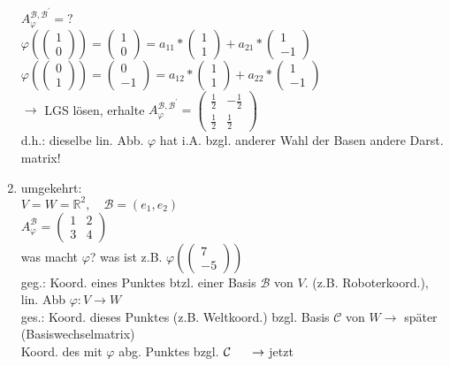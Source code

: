 \documentclass[a4paper,11pt]{article}
\newcommand{\hsp}{\hspace{5mm}}
\begin{document}
\begin{enumerate}[label=\alph*)]
	$A^{\mathcal{B},\mathcal{B}^\prime}_\varphi=?$ \\
	$\varphi\left(\begin{pmatrix}1\\0\end{pmatrix}\right)=\begin{pmatrix}1\\0\end{pmatrix}=a_{11}*\begin{pmatrix}1\\1\end{pmatrix}+a_{21}*\begin{pmatrix}1\\-1\end{pmatrix}$ \\
	$\varphi\left(\begin{pmatrix}0\\1\end{pmatrix}\right)=\begin{pmatrix}0\\-1\end{pmatrix}=a_{12}*\begin{pmatrix}1\\1\end{pmatrix}+a_{22}*\begin{pmatrix}1\\-1\end{pmatrix}$ \\
	$\rightarrow$ LGS lösen, erhalte $A^{\mathcal{B},\mathcal{B}^\prime}_\varphi=\begin{pmatrix}\frac{1}{2} & -\frac{1}{2} \\ \frac{1}{2} & \frac{1}{2}\end{pmatrix}$ \\
	d.h.: dieselbe lin. Abb. $\varphi$ hat i.A. bzgl. anderer Wahl der Basen andere Darst. matrix!
	\item umgekehrt: \\
	$V=W=\mathbb{R}^2,\quad\mathcal{B}=(e_1,e_2)$ \\
	$A^\mathcal{B}_\varphi=\begin{pmatrix}1 & 2 \\ 3 & 4\end{pmatrix}$ \\
	was macht $\varphi$? was ist z.B. $\varphi\left(\begin{pmatrix}7\\-5\end{pmatrix}\right)$ \\
	geg.: Koord. eines Punktes btzl. einer Basis $\mathcal{B}$ von $V$. (z.B. Roboterkoord.), lin. Abb $\varphi\colon V\to W$ \\
	ges.: Koord. dieses Punktes (z.B. Weltkoord.) bzgl. Basis $\mathcal{C}$ von $W$\hsp$\rightarrow$ später (Basiswechselmatrix) \\
	Koord. des mit $\varphi$ abg. Punktes bzgl. $\mathcal{C}\hsp\rightarrow$ jetzt
\end{enumerate}
\end{document}
